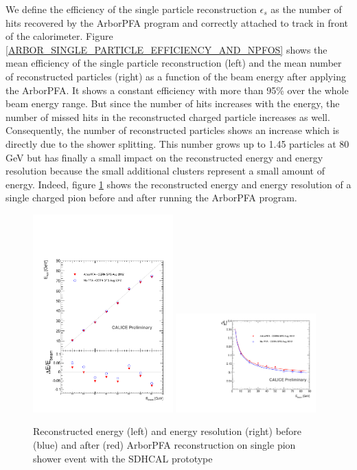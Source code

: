 \documentclass[cits]{JINST}
\begin{document}
We define the efficiency of the single particle reconstruction $\epsilon_s$ as the number of hits recovered by the ArborPFA program and correctly attached to track in front of the calorimeter. Figure \ref{ARBOR_SINGLE_PARTICLE_EFFICIENCY_AND_NPFOS} shows the mean efficiency of the single particle reconstruction (left) and the mean number of reconstructed particles (right) as a function of the beam energy after applying the ArborPFA. It shows a constant efficiency with more than 95\% over the whole beam energy range. But since the number of hits increases with the energy, the number of missed hits in the reconstructed charged particle increases as well. Consequently, the number of reconstructed particles shows an increase which is directly due to the shower splitting. This number grows up to 1.45 particles at 80 GeV but has finally a small impact on the reconstructed energy and energy resolution because the small additional clusters represent a small amount of energy. Indeed, figure \ref{ARBOR_SINGLE_PARTICLE_EREC_AND_ERESOL} shows the reconstructed energy and energy resolution of a single charged pion before and after running the ArborPFA program. 

\begin{figure}[!h]
  \begin{center}
    \includegraphics[width=0.48\textwidth]{plots/SingleParticle_ERec.pdf}
    \includegraphics[width=0.48\textwidth]{plots/SingleParticle_EResol.pdf} \\
  \end{center}
  \caption{\label{ARBOR_SINGLE_PARTICLE_EREC_AND_ERESOL} Reconstructed energy (left) and energy resolution (right) before (blue) and after (red) ArborPFA reconstruction on single pion shower event with the SDHCAL prototype}
\end{figure}
\end{document}
